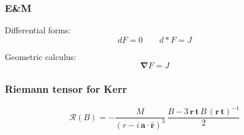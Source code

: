 \documentclass[12pt,xcolor={dvipsnames}]{beamer}
\renewcommand{\vec}{\bm}
\begin{document}
\begin{frame}
  \frametitle{E\&M}
  Differential forms:
  \begin{equation*}
    dF = 0 \qquad d\ast F = J
  \end{equation*}
  \pause

  Geometric calculus:
  \begin{equation*}
    \vec{\nabla} F = J
  \end{equation*}
\end{frame}

\begin{frame}
  \frametitle{Riemann tensor for Kerr}
  \begin{equation*}
    \mathcal{R}(B) = - \frac{M} {(r-i\, \vec{a} \cdot
      \hat{\vec{r}})^{3}}\, \frac{B - 3\, \vec{r}\, \vec{t}\, B\,
      (\vec{r}\, \vec{t})^{-1}} {2}
  \end{equation*}
\end{frame}
\end{document}

